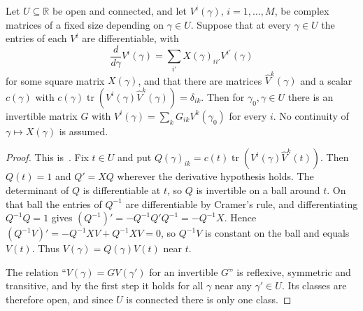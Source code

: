 \begin{lemma}
    \leanok
    \label{lem:glm_l_path_frame}
    Let $U\subseteq\mathbb R$ be open and connected, and let $V^i(\gamma)$,
    $i=1,\ldots,M$, be complex matrices of a fixed size depending on
    $\gamma\in U$. Suppose that at every $\gamma\in U$ the entries of each
    $V^i$ are differentiable, with
    \[
        \frac{d}{d\gamma}V^i(\gamma)=\sum_{i'}X(\gamma)_{ii'}V^{i'}(\gamma)
    \]
    for some square matrix $X(\gamma)$, and that there are matrices
    $\widehat V^k(\gamma)$ and a scalar $c(\gamma)$ with
    $c(\gamma)\operatorname{tr}(V^i(\gamma)\widehat V^k(\gamma))=\delta_{ik}$.
    Then for $\gamma_0,\gamma\in U$ there is an invertible matrix $G$ with
    $V^i(\gamma)=\sum_kG_{ik}V^k(\gamma_0)$ for every $i$. No continuity of
    $\gamma\mapsto X(\gamma)$ is assumed.
\end{lemma}
\begin{proof}
    \leanok
    This is~\cite[``A frame whose derivative stays in its
        span'']{QICLean2026Blueprint}.
    Fix $t\in U$ and put
    $Q(\gamma)_{ik}=c(t)\operatorname{tr}(V^i(\gamma)\widehat V^k(t))$. Then
    $Q(t)=1$ and $Q'=XQ$ wherever the derivative hypothesis holds. The
    determinant of $Q$ is differentiable at $t$, so $Q$ is invertible on a
    ball around $t$. On that ball the entries of $Q^{-1}$ are differentiable
    by Cramer's rule, and differentiating $Q^{-1}Q=1$ gives
    $(Q^{-1})'=-Q^{-1}Q'Q^{-1}=-Q^{-1}X$. Hence
    $(Q^{-1}V)'=-Q^{-1}XV+Q^{-1}XV=0$, so $Q^{-1}V$ is constant on the ball
    and equals $V(t)$. Thus $V(\gamma)=Q(\gamma)V(t)$ near $t$.

    The relation ``$V(\gamma)=GV(\gamma')$ for an invertible $G$'' is
    reflexive, symmetric and transitive, and by the first step it holds for
    all $\gamma$ near any $\gamma'\in U$. Its classes are therefore open, and
    since $U$ is connected there is only one class.
\end{proof}

